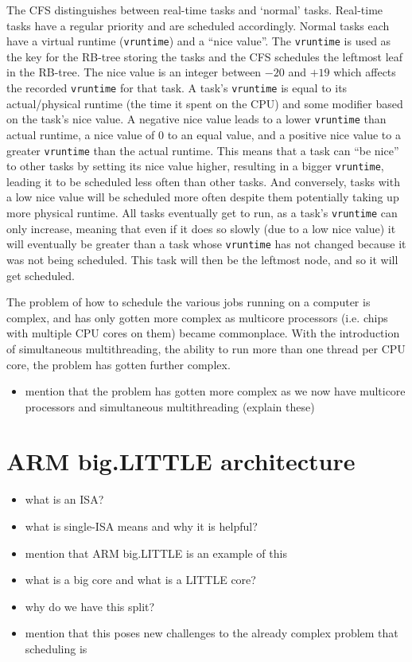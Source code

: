    The CFS distinguishes between real-time tasks and `normal' tasks. Real-time
    tasks have a regular priority and are scheduled accordingly. Normal tasks
    each have a virtual runtime (\texttt{vruntime}) and a ``nice value''. The
    \texttt{vruntime} is used as the key for the RB-tree storing the tasks and
    the CFS schedules the leftmost leaf in the RB-tree. The nice value is an
    integer between $-20$ and $+19$ which affects the recorded \texttt{vruntime}
    for that task. A task's \texttt{vruntime} is equal to its actual/physical
    runtime (the time it spent on the CPU) and some modifier based on the task's
    nice value. A negative nice value leads to a lower \texttt{vruntime} than
    actual runtime, a nice value of 0 to an equal value, and a positive nice
    value to a greater \texttt{vruntime} than the actual runtime. This means
    that a task can ``be nice'' to other tasks by setting its nice value higher,
    resulting in a bigger \texttt{vruntime}, leading it to be scheduled less
    often than other tasks. And conversely, tasks with a low nice value will be
    scheduled more often despite them potentially taking up more physical
    runtime. All tasks eventually get to run, as a task's \texttt{vruntime} can
    only increase, meaning that even if it does so slowly (due to a low nice
    value) it will eventually be greater than a task whose \texttt{vruntime} has
    not changed because it was not being scheduled. This task will then be the
    leftmost node, and so it will get scheduled.

The problem of how to schedule the various
jobs running on a computer is complex, and has only gotten more complex as
multicore processors (i.e. chips with multiple CPU cores on them) became
commonplace. With the introduction of simultaneous multithreading, the ability
to run more than one thread per CPU core, the problem has gotten further
complex. 


\begin{itemize}
    \item mention that the problem has gotten more complex as we now have
          multicore processors and simultaneous multithreading (explain these)
\end{itemize}

\section{ARM big.LITTLE architecture}
\begin{itemize}
    \item what is an ISA?
    \item what is single-ISA means and why it is helpful?
    \item mention that ARM big.LITTLE is an example of this
    \item what is a big core and what is a LITTLE core?
    \item why do we have this split?
    \item mention that this poses new challenges to the already complex problem
          that scheduling is
\end{itemize}
